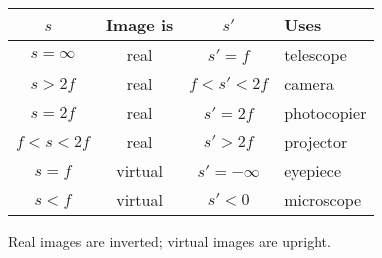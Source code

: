 \documentclass[../main.tex]{subfiles}
\begin{document}
	\begin{center}
		\begin{tabularx}{0.95\linewidth}{cccX}
			\hline \hline
			\(s\)\ & Image is & \(s'\) & Uses \\ 
			\hline 
			\(s=\infty\) & real & \(s'=f\) & telescope \\  
			\(s>2f\) & real & \(f<s'<2f\) & camera \\  
			\(s=2f\) & real & \(s'=2f\) & photocopier \\  
			\(f<s<2f\) & real & \(s'>2f\) & projector \\  
			\(s=f\) & virtual & \(s'=-\infty\) & eyepiece \\  
			\(s<f\) & virtual & \(s'<0\) & microscope \\ 
			\hline \hline
		\end{tabularx} 
	\end{center}

	Real images are inverted; virtual images are upright.
	
	
\end{document}
